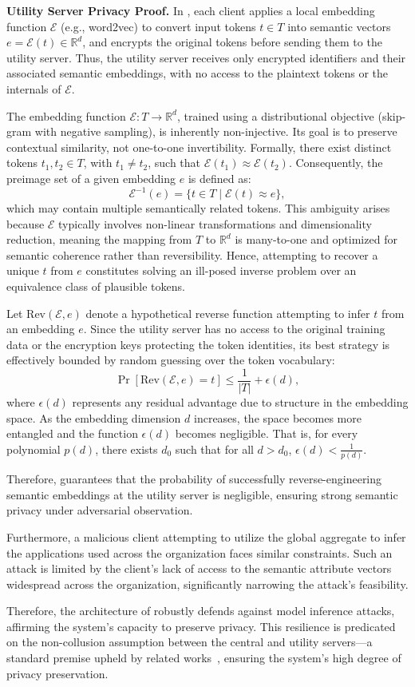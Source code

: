 \textbf{Utility Server Privacy Proof.}  
In \Sys, each client applies a local embedding function \(\mathcal{E}\) (e.g., word2vec) to convert input tokens \(t \in T\) into semantic vectors \(e = \mathcal{E}(t) \in \mathbb{R}^d\), and encrypts the original tokens before sending them to the utility server. Thus, the utility server receives only encrypted identifiers and their associated semantic embeddings, with no access to the plaintext tokens or the internals of \(\mathcal{E}\).

The embedding function \(\mathcal{E}: T \to \mathbb{R}^d\), trained using a distributional objective (skip-gram with negative sampling), is inherently non-injective. Its goal is to preserve contextual similarity, not one-to-one invertibility. Formally, there exist distinct tokens \(t_1, t_2 \in T\), with \(t_1 \neq t_2\), such that \(\mathcal{E}(t_1) \approx \mathcal{E}(t_2)\). Consequently, the preimage set of a given embedding \(e\) is defined as:
\[
\mathcal{E}^{-1}(e) = \{t \in T \mid \mathcal{E}(t) \approx e\},
\]
which may contain multiple semantically related tokens. This ambiguity arises because \(\mathcal{E}\) typically involves non-linear transformations and dimensionality reduction, meaning the mapping from \(T\) to \(\mathbb{R}^d\) is many-to-one and optimized for semantic coherence rather than reversibility. Hence, attempting to recover a unique \(t\) from \(e\) constitutes solving an ill-posed inverse problem over an equivalence class of plausible tokens.

Let \(\text{Rev}(\mathcal{E}, e)\) denote a hypothetical reverse function attempting to infer \(t\) from an embedding \(e\). Since the utility server has no access to the original training data or the encryption keys protecting the token identities, its best strategy is effectively bounded by random guessing over the token vocabulary:
\[
\Pr[\text{Rev}(\mathcal{E}, e) = t] \leq \frac{1}{|T|} + \epsilon(d),
\]
where \(\epsilon(d)\) represents any residual advantage due to structure in the embedding space. As the embedding dimension \(d\) increases, the space becomes more entangled and the function \(\epsilon(d)\) becomes negligible. That is, for every polynomial \(p(d)\), there exists \(d_0\) such that for all \(d > d_0\), \(\epsilon(d) < \frac{1}{p(d)}\).

Therefore, \Sys guarantees that the probability of successfully reverse-engineering semantic embeddings at the utility server is negligible, ensuring strong semantic privacy under adversarial observation.

Furthermore, a malicious client attempting to utilize the global aggregate to infer the applications used across the organization faces similar constraints. Such an attack is limited by the client's lack of access to the semantic attribute vectors widespread across the organization, significantly narrowing the attack's feasibility.

Therefore, the architecture of \Sys robustly defends against model inference attacks, affirming the system's capacity to preserve privacy. This resilience is predicated on the non-collusion assumption between the central and utility servers—a standard premise upheld by related works~\cite{roy2020crypte,wu2022federated}, ensuring the system's high degree of privacy preservation.


